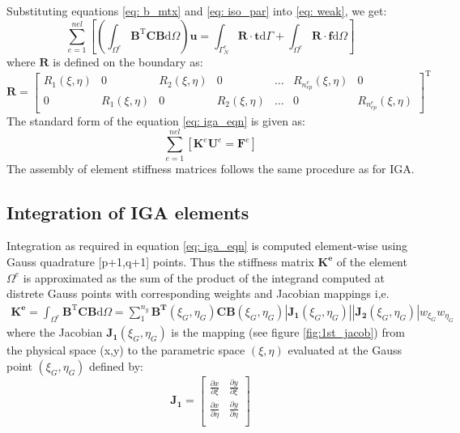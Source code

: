 \documentclass[12pt, a4paper]{report}
\begin{document}
Substituting equations \ref{eq: b_mtx} and \ref{eq: iso_par} into \ref{eq: weak}, we get:
\begin{equation} \label{eq: iga_eqn}
\sum_{e=1}^{n e l}\left[\left(\int_{\Omega^{e}} \mathbf{B}^{\mathrm{T}} \mathbf{C B} \mathrm{d} \Omega\right) \mathbf{u}=\int_{\Gamma_{N}^{e}} \mathbf{R} \cdot \boldsymbol{t} \mathrm{d} \Gamma+\int_{\Omega^{e}} \mathbf{R} \cdot \boldsymbol{f} \mathrm{d} \Omega\right]
\end{equation}
where $\mathbf{R}$ is defined on the boundary as:
\begin{equation}
\mathbf{R}=\left[\begin{array}{ccccccc}R_{1}(\xi, \eta) & 0 & R_{2}(\xi, \eta) & 0 & \ldots & R_{n_{e p}^{e}}(\xi, \eta) & 0 \\ 0 & R_{1}(\xi, \eta) & 0 & R_{2}(\xi, \eta) & \ldots & 0 & R_{n_{e p}^{e}}(\xi, \eta)\end{array}\right]^{\mathrm{T}}   
\end{equation}
The standard form of the equation \ref{eq: iga_eqn} is given as:
\begin{equation}
    \sum_{e=1}^{n e l}\left[\mathbf{K}^{e} \mathbf{U}^{e}=\mathbf{F}^{e}\right]
\end{equation}
The assembly of element stiffness matrices follows the same procedure as for IGA.
\subsection{Integration of IGA elements} \label{sec: iga_ele_integration}
Integration as required in equation \ref{eq: iga_eqn} is computed element-wise using Gauss quadrature [p+1,q+1] points. Thus the stiffness matrix $\mathbf{K^e}$ of the element $\Omega^e$ is approximated as the sum of the product of the integrand computed at distrete Gauss points with corresponding weights and Jacobian mappings i,e.
\begin{align}
    \mathbf{K^e} = \int_{\Omega^{e}} \mathbf{B}^{\mathrm{T}} \mathbf{C B} \mathrm{d} \Omega
     = \sum_{1}^{n_g}\mathbf{B^T}(\xi_G,\eta_G)\mathbf{C}\mathbf{B}(\xi_G,\eta_G) \left |\mathbf{J_1}(\xi_G,\eta_G)\right| \left |\mathbf{J_2}(\xi_G,\eta_G)\right |w_{\xi_G}w_{\eta_G}
\end{align}
where the Jacobian $\mathbf{J_1}(\xi_G,\eta_G)$ is the mapping (see figure \ref{fig:1st_jacob}) from the physical space (x,y) to the parametric space $(\xi,\eta)$ evaluated at the Gauss point $(\xi_G,\eta_G)$ defined by:
\begin{equation}
    \mathbf{J_1}= \begin{bmatrix}
    \frac{\partial x}{\partial \xi} &  \frac{\partial y}{\partial \xi} \\
    \frac{\partial x}{\partial \eta} & \frac{\partial y}{\partial \eta}  \\
\end{bmatrix}
\end{equation}
\end{document}
